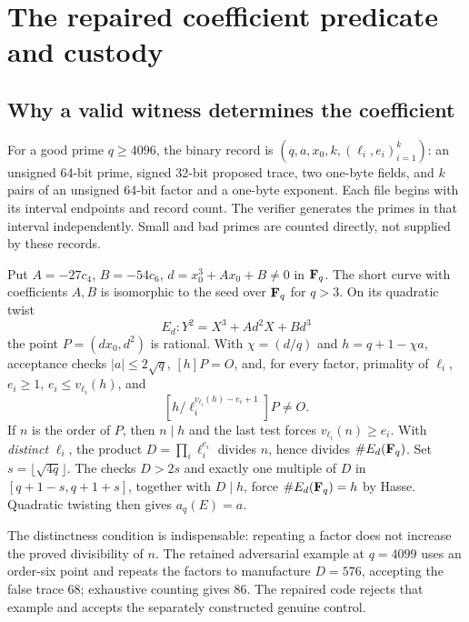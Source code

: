 \section{The repaired coefficient predicate and custody}\label{app:verifierproof}

\subsection{Why a valid witness determines the coefficient}
For a good prime $q\ge4096$, the binary record is $(q,a,x_0,k,(\ell_i,e_i)_{i=1}^k)$: an unsigned 64-bit prime, signed 32-bit proposed trace, two one-byte fields, and $k$ pairs of an unsigned 64-bit factor and a one-byte exponent. Each file begins with its interval endpoints and record count. The verifier generates the primes in that interval independently. Small and bad primes are counted directly, not supplied by these records.

Put $A=-27c_4$, $B=-54c_6$, $d=x_0^3+Ax_0+B\ne0$ in $\mathbf{F}_q$. The short curve with coefficients $A,B$ is isomorphic to the seed over $\mathbf{F}_q$ for $q>3$. On its quadratic twist
\[
E_d:Y^2=X^3+Ad^2X+Bd^3
\]
the point $P=(dx_0,d^2)$ is rational. With $\chi=(d/q)$ and $h=q+1-\chi a$, acceptance checks $|a|\le2\sqrt q$, $[h]P=O$, and, for every factor, primality of $\ell_i$, $e_i\ge1$, $e_i\le v_{\ell_i}(h)$, and
\[
 [h/\ell_i^{v_{\ell_i}(h)-e_i+1}]P\ne O.
\]
If $n$ is the order of $P$, then $n\mid h$ and the last test forces $v_{\ell_i}(n)\ge e_i$. With \emph{distinct} $\ell_i$, the product $D=\prod_i\ell_i^{e_i}$ divides $n$, hence divides $\#E_d(\mathbf{F}_q)$. Set $s=\lfloor\sqrt{4q}\rfloor$. The checks $D>2s$ and exactly one multiple of $D$ in $[q+1-s,q+1+s]$, together with $D\mid h$, force $\#E_d(\mathbf{F}_q)=h$ by Hasse. Quadratic twisting then gives $a_q(E)=a$.

The distinctness condition is indispensable: repeating a factor does not increase the proved divisibility of $n$. The retained adversarial example at $q=4099$ uses an order-six point and repeats the factors to manufacture $D=576$, accepting the false trace $68$; exhaustive counting gives $86$. The repaired code rejects that example and accepts the separately constructed genuine control.

